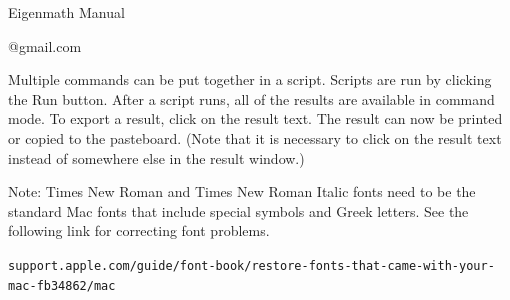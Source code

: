 
\begin{center}
{\LARGE Eigenmath Manual}

@gmail.com
\end{center}

\begin{center}
\end{center}

Multiple commands can be put together in a script.
Scripts are run by clicking the Run button.
After a script runs, all of the results are available in command mode.
To export a result, click on the result text.
The result can now be printed or copied to the pasteboard.
(Note that it is necessary to click on the result text
instead of somewhere else in the result window.)

\bigskip
Note: Times New Roman and Times New Roman Italic fonts need
to be the standard Mac fonts that include special symbols and Greek letters.
See the following link for correcting font problems.

\bigskip
{\footnotesize\verb$support.apple.com/guide/font-book/restore-fonts-that-came-with-your-mac-fb34862/mac$}

\newpage
\tableofcontents


